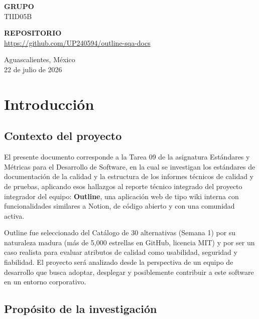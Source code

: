 \documentclass[12pt, letterpaper]{article}
\begin{document}
\begin{titlepage}
\begin{center}
        \vspace{0.2cm}

        {\large \textbf{GRUPO}}\\
        TIID05B

        \vspace{0.2cm}

        {\large \textbf{REPOSITORIO}}\\
        \url{https://github.com/UP240594/outline-sqa-docs}

        \vfill

        {\large Aguascalientes, México\\
        22 de julio de 2026}
    \end{center}
\end{titlepage}

\newpage
\tableofcontents
\newpage

\section{Introducción}

\subsection{Contexto del proyecto}

El presente documento corresponde a la Tarea 09 de la asignatura Estándares y Métricas para el Desarrollo de Software, en la cual se investigan los estándares de documentación de la calidad y la estructura de los informes técnicos de calidad y de pruebas, aplicando esos hallazgos al reporte técnico integrado del proyecto integrador del equipo: \textbf{Outline}, una aplicación web de tipo wiki interna con funcionalidades similares a Notion, de código abierto y con una comunidad activa.

Outline fue seleccionado del Catálogo de 30 alternativas (Semana 1) por su naturaleza madura (más de 5,000 estrellas en GitHub, licencia MIT) y por ser un caso realista para evaluar atributos de calidad como usabilidad, seguridad y fiabilidad. El proyecto será analizado desde la perspectiva de un equipo de desarrollo que busca adoptar, desplegar y posiblemente contribuir a este software en un entorno corporativo.

\subsection{Propósito de la investigación}
\end{document}
